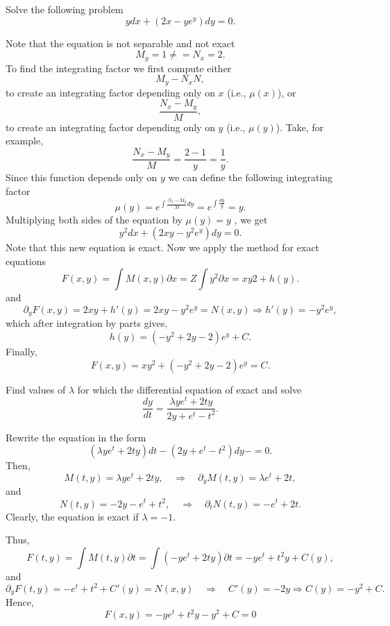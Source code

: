 \documentclass[11pt]{article}
\begin{document}
\begin{problem}
Solve the following problem
\begin{equation*}
ydx + (2x - y e^{y}) dy = 0.
\end{equation*}
\end{problem}
\begin{solution}
Note that the equation is not separable and not exact
\[M _{y} = 1 \neq = N_{ x} = 2 .\]
To find the integrating factor we first compute either
\[M_{ y} - N_{ x} N ,\]
to create an integrating factor depending only on $x$ (i.e., $\mu( x )$), or
\[\frac{N_{ x} - M_{ y}}{ M} ,\]
to create an integrating factor depending only on $y$ (i.e., $\mu ( y )$).
Take, for example,
\[\frac{N_{ x} - M_{ y}}{ M} = \frac{2 - 1}{ y} = \frac{1}{y}.\]
Since this function depends only on $y$ we can define the following integrating factor 
\[\mu( y ) = e^{ \int \frac{N_{ x} - M_{ y}}{ M} dy }= e^{ \int \frac{ dy}{ y}} = y.\]
Multiplying both sides of the equation by $\mu ( y ) = y$ , we get
\[y^{ 2} dx + (2 xy - y^{ 2} e^{ y} ) dy = 0 .\]
Note that this new equation is exact.  Now we apply the method for exact equations
\[F ( x,y ) = \int M ( x,y ) \partial x = Z\int y^{ 2} \partial x = xy 2 + h ( y ) .\]
and
\[\partial_{ y} F ( x,y ) = 2 xy + h'( y ) = 2 xy - y^{ 2} e^{ y} = N ( x,y ) \Rightarrow h'( y ) = - y^{ 2} e^{ y} ,\]
which after integration by parts gives,
\[ h ( y ) = ( - y^{ 2} + 2 y - 2) e^{y} +C.\]
Finally,
\[\boxed{F ( x,y ) = xy^{ 2} + ( - y^{ 2} + 2 y - 2) e^{ y} = C }.\]
\end{solution}


\begin{problem}
Find values of $\lambda$ for which the differential equation of exact and solve
\[\dfrac{dy}{dt}=\frac{\lambda y e^{t}+ 2ty}{2y+e^{t}-t^{2}}.\]
\end{problem}
\begin{solution}
Rewrite the equation in the form
\[(\lambda y e^{t}+ 2ty)dt - (2y+e^{t}-t^{2})dy-=0.\]
Then,
\[M(t,y)= \lambda y e^{t} + 2ty,\quad \Rightarrow \quad \partial_{y}M(t,y)=  \lambda e^{t} + 2t, \]
and
\[N(t,y)=-2y-e^{t}+t^{2},\quad \Rightarrow \quad \partial_{t}N(t,y)= -e^{t} +2 t.\]
Clearly, the equation is exact if $\lambda  = -1$.

Thus, 
\[F(t,y)= \int M(t,y) \partial t = \int (-ye^{t}+2ty) \partial t = -ye^{t} +t^{2}y + C(y),\]
and
\[\partial_{y}F(t,y)= -e^{t} +t^{2} + C'(y) = N(x,y) \quad \Rightarrow  \quad C'(y) = -2y \Rightarrow C(y)= - y^{2} + C.\]
Hence,
\[\boxed{F(x,y)= -ye^{t} + t^{2}y  - y^{2} + C = 0}\]
\end{solution}
\end{document}

